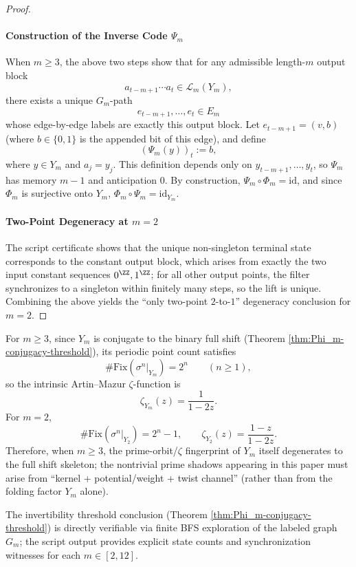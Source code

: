 \begin{proof}
\paragraph{Construction of the Inverse Code \texorpdfstring{$\Psi_m$}{Psi\_m}}
When $m\ge 3$, the above two steps show that for any admissible length-$m$ output block
$$
a_{t-m+1}\cdots a_t\in\mathcal{L}_m(Y_m),
$$
there exists a unique $G_m$-path
$$
e_{t-m+1},\dots,e_t\in E_m
$$
whose edge-by-edge labels are exactly this output block.
Let $e_{t-m+1}=(v,b)$ (where $b\in\{0,1\}$ is the appended bit of this edge), and define
$$
(\Psi_m(y))_t:=b,
$$
where $y\in Y_m$ and $a_j=y_j$.
This definition depends only on $y_{t-m+1},\dots,y_t$, so $\Psi_m$ has memory $m-1$ and anticipation $0$.
By construction, $\Psi_m\circ\Phi_m=\mathrm{id}$, and since $\Phi_m$ is surjective onto $Y_m$, $\Phi_m\circ\Psi_m=\mathrm{id}_{Y_m}$.

\paragraph{Two-Point Degeneracy at $m=2$}
The script certificate shows that the unique non-singleton terminal state corresponds to the constant output block, which arises from exactly the two input constant sequences $0^{\ZZ},1^{\ZZ}$;
for all other output points, the filter synchronizes to a singleton within finitely many steps, so the lift is unique.
Combining the above yields the ``only two-point $2$-to-$1$'' degeneracy conclusion for $m=2$.
\end{proof}

\begin{corollary}\label{cor:Phi_m-zeta-closed}
For $m\ge 3$, since $Y_m$ is conjugate to the binary full shift (Theorem \ref{thm:Phi_m-conjugacy-threshold}), its periodic point count satisfies
$$
\#\mathrm{Fix}(\sigma^n|_{Y_m})=2^n\qquad(n\ge 1),
$$
so the intrinsic Artin--Mazur \(\zeta\)-function is
$$
\zeta_{Y_m}(z)=\frac{1}{1-2z}.
$$
For $m=2$,
$$
\#\mathrm{Fix}(\sigma^n|_{Y_2})=2^n-1,\qquad
\zeta_{Y_2}(z)=\frac{1-z}{1-2z}.
$$
Therefore, when $m\ge 3$, the prime-orbit/\(\zeta\) fingerprint of $Y_m$ itself degenerates to the full shift skeleton; the nontrivial prime shadows appearing in this paper must arise from ``kernel + potential/weight + twist channel'' (rather than from the folding factor $Y_m$ alone).
\end{corollary}

\vspace{\baselineskip}

\begin{remark}
The invertibility threshold conclusion (Theorem \ref{thm:Phi_m-conjugacy-threshold}) is directly verifiable via finite BFS exploration of the labeled graph $G_m$; the script output provides explicit state counts and synchronization witnesses for each $m\in[2,12]$.
\end{remark}
